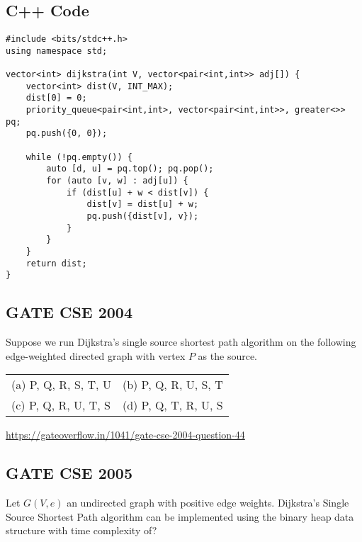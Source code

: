 \documentclass[a4paper,14pt]{extarticle}
\begin{document}
\subsection*{C++ Code}
\begin{lstlisting}[style=cpp, caption={Dijkstra’s Algorithm in C++}]
#include <bits/stdc++.h>
using namespace std;

vector<int> dijkstra(int V, vector<pair<int,int>> adj[]) {
    vector<int> dist(V, INT_MAX);
    dist[0] = 0;
    priority_queue<pair<int,int>, vector<pair<int,int>>, greater<>> pq;
    pq.push({0, 0});

    while (!pq.empty()) {
        auto [d, u] = pq.top(); pq.pop();
        for (auto [v, w] : adj[u]) {
            if (dist[u] + w < dist[v]) {
                dist[v] = dist[u] + w;
                pq.push({dist[v], v});
            }
        }
    }
    return dist;
}
\end{lstlisting}


\newpage
\subsection{GATE CSE 2004}
Suppose we run Dijkstra’s single source shortest path algorithm on the 
following edge-weighted directed graph with vertex $P$ as the source.



\begin{tabular}{ll}
(a) P, Q, R, S, T, U \hspace{4cm} & (b) P, Q, R, U, S, T \\
(c) P, Q, R, U, T, S \hspace{4cm} & (d) P, Q, T, R, U, S \\
\end{tabular}
\vspace{0.5cm}

\url{https://gateoverflow.in/1041/gate-cse-2004-question-44}

\subsection{GATE CSE 2005}
Let $G(V, e)$ an undirected graph with positive edge weights. Dijkstra's Single Source
Shortest Path algorithm can be implemented using the binary heap data structure with 
time complexity of?
\end{document}

